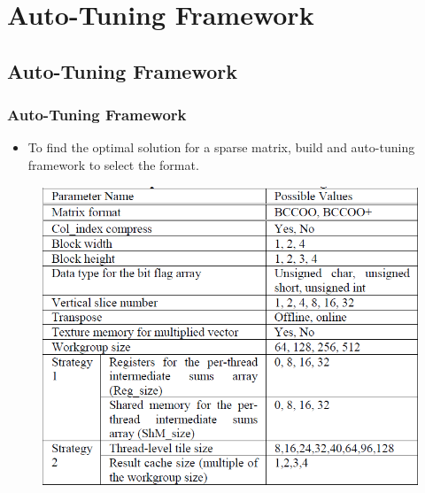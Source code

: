 \section{Auto-Tuning Framework}

\subsection{Auto-Tuning Framework}
\begin{frame}
	\frametitle{Auto-Tuning Framework}
	\begin{itemize}
		\item To find the optimal solution for a sparse matrix, build
			and auto-tuning framework to select the format.
	\end{itemize}
	\begin{figure}
		\includegraphics[scale=0.3]{figure/fig4-parameters.png}
	\end{figure}
\end{frame}